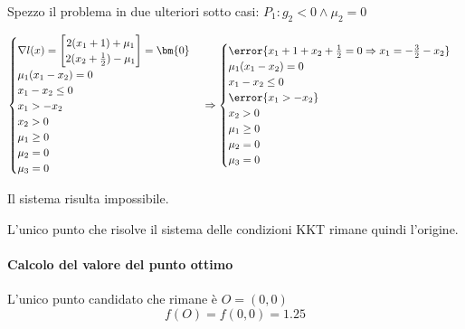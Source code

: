 \documentclass[\main/main.tex]{subfiles}
\begin{document}
Spezzo il problema in due ulteriori sotto casi: $P_1: g_2<0 \land \mu_2=0$

\[
  \begin{cases}
    \nabla l(x) = \begin{bmatrix}
      2(x_1+1) + \mu_1           \\
      2(x_2+\frac{1}{2}) - \mu_1 \\
    \end{bmatrix} = \bm{0} \\
    \mu_1(x_1 - x_2) = 0                              \\
    x_1 - x_2 \leq 0                                  \\
    x_1 > -x_2                                        \\
    x_2 > 0                                           \\
    \mu_1 \geq 0                                      \\
    \mu_2 = 0                                         \\
    \mu_3 = 0                                         \\
  \end{cases}
  \Rightarrow
  \begin{cases}
    \error{x_1+1 + x_2+\frac{1}{2} = 0 \Rightarrow x_1 = -\frac{3}{2} - x_2} \\
    \mu_1(x_1 - x_2) = 0                                                     \\
    x_1 - x_2 \leq 0                                                         \\
    \error{x_1 > -x_2}                                                       \\
    x_2 > 0                                                                  \\
    \mu_1 \geq 0                                                             \\
    \mu_2 = 0                                                                \\
    \mu_3 = 0                                                                \\
  \end{cases}
\]

Il sistema risulta impossibile.

L'unico punto che risolve il sistema delle condizioni KKT rimane quindi l'origine.

\paragraph*{Calcolo del valore del punto ottimo}
L'unico punto candidato che rimane è $O = (0,0)$
\[
  f(O) = f(0,0) = 1.25
\]
\end{document}

